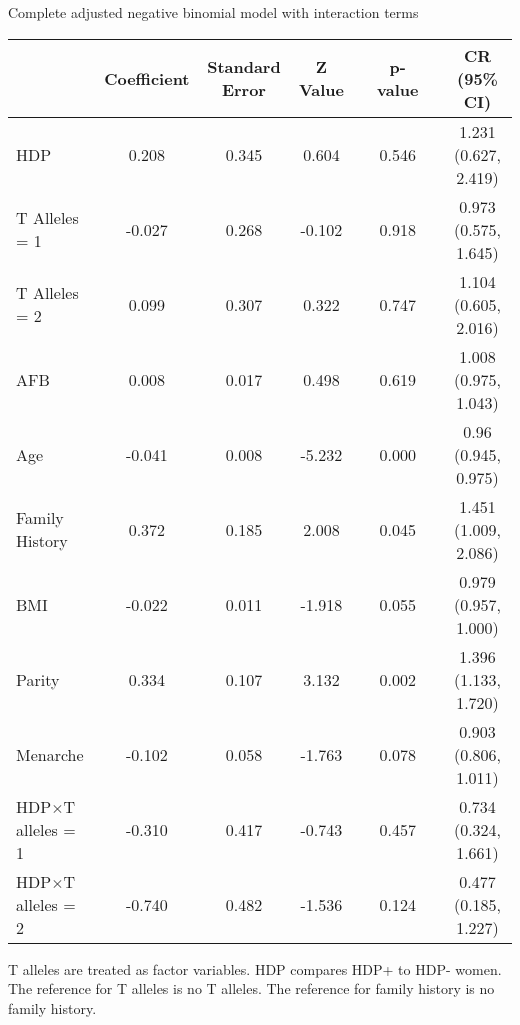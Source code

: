 \documentclass{standalone}
\begin{document}
\begin{threeparttable}
\caption{Complete adjusted negative binomial model with interaction terms} 
\begin{tabular}{@{}lccccccc@{}}
  \toprule
 & Coefficient & Standard Error & Z Value & \hspace{1em} & p-value & \hspace{1em} & CR (95\% CI) \\ 
  \midrule
  HDP & 0.208 & 0.345 & 0.604 && 0.546 && 1.231 (0.627, 2.419) \\ 
  T Alleles = 1 & -0.027 & 0.268 & -0.102 && 0.918 && 0.973 (0.575, 1.645) \\ 
  T Alleles = 2 & 0.099 & 0.307 & 0.322 && 0.747 && 1.104 (0.605, 2.016) \\ 
  AFB & 0.008 & 0.017 & 0.498 && 0.619 && 1.008 (0.975, 1.043) \\ 
  Age & -0.041 & 0.008 & -5.232 && 0.000 && 0.96 (0.945, 0.975) \\ 
  Family History & 0.372 & 0.185 & 2.008 && 0.045 && 1.451 (1.009, 2.086) \\ 
  BMI & -0.022 & 0.011 & -1.918 && 0.055 && 0.979 (0.957, 1.000) \\ 
  Parity & 0.334 & 0.107 & 3.132 && 0.002 && 1.396 (1.133, 1.720) \\ 
  Menarche & -0.102 & 0.058 & -1.763 && 0.078 && 0.903 (0.806, 1.011) \\ 
  HDP$\times$T alleles = 1 & -0.310 & 0.417 & -0.743 && 0.457 && 0.734 (0.324, 1.661) \\ 
  HDP$\times$T alleles = 2 & -0.740 & 0.482 & -1.536 && 0.124 && 0.477 (0.185, 1.227) \\ 
   \bottomrule
\end{tabular}
\captionsetup{justification   = raggedright,
              singlelinecheck = false}
\caption*{T alleles are treated as factor variables. HDP compares HDP+ to HDP- women. The reference for T alleles is no T alleles. The reference for family history is no family history.}
\end{threeparttable}
\end{document}
